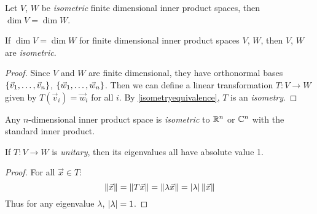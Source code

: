 \begin{corollary}
  Let $V$, $W$ be \emph{isometric} finite dimensional inner product spaces, then $\dim V = \dim W$.
\end{corollary}

\begin{corollary}
  If $\dim V = \dim W$ for finite dimensional inner product spaces $V$, $W$, then $V$, $W$ are \emph{isometric}.
\end{corollary}
\begin{proof}
  Since $V$ and $W$ are finite dimensional, they have orthonormal bases $\left\{\vec v_1, \ldots, \vec v_n\right\}$,
  $\left\{\vec w_1, \ldots, \vec w_n\right\}$. Then we can define a linear transformation $T : V \to W$
  given by $T(\vec v_i) = \vec w_i$ for all $i$.
  By \ref{isometryequivalence}, $T$ is an \emph{isometry}.
\end{proof}

\begin{corollary}
  Any $n$-dimensional inner product space is \emph{isometric} to $\mathbb{R}^n$ or $\mathbb{C}^n$
  with the standard inner product.
\end{corollary}

\begin{corollary}
  If $T : V \to W$ is \emph{unitary}, then its eigenvalues all have absolute value 1.
\end{corollary}
\begin{proof}
  For all $\vec x \in T$:
  $$\left\lVert\vec x\right\rVert = \left\lVert T \vec x\right\rVert = \left\lVert\lambda \vec x\right\rVert = \left|\lambda\right|\left\lVert\vec x\right\rVert$$
  Thus for any eigenvalue $\lambda$, $\left|\lambda\right| = 1$.
\end{proof}

